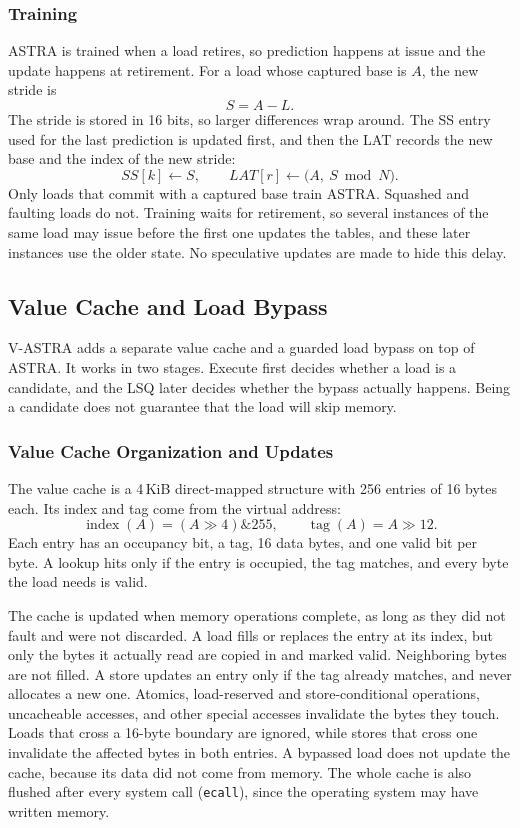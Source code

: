 \subsubsection{Training}

ASTRA is trained when a load retires, so prediction happens at issue
and the update happens at retirement. For a load whose captured base
is \(A\), the new stride is
\[
    S = A - L.
\]
The stride is stored in 16 bits, so larger differences wrap around.
The SS entry used for the last prediction is updated first, and then
the LAT records the new base and the index of the new stride:
\[
    SS[k] \leftarrow S, \qquad
    LAT[r] \leftarrow \bigl(A,\ S \bmod N\bigr).
\]
Only loads that commit with a captured base train ASTRA. Squashed and
faulting loads do not. Training waits for retirement, so several
instances of the same load may issue before the first one updates the
tables, and these later instances use the older state. No speculative
updates are made to hide this delay.

\subsection{Value Cache and Load Bypass}
\label{sec:impl-vcache}

V-ASTRA adds a separate value cache and a guarded load bypass on top
of ASTRA. It works in two stages. Execute first decides whether a load
is a candidate, and the LSQ later decides whether the bypass actually
happens. Being a candidate does not guarantee that the load will skip
memory.

\subsubsection{Value Cache Organization and Updates}

The value cache is a 4\,KiB direct-mapped structure with 256 entries
of 16 bytes each. Its index and tag come from the virtual address:
\[
    \operatorname{index}(A) = (A \gg 4) \mathbin{\&} 255,
    \qquad
    \operatorname{tag}(A) = A \gg 12.
\]
Each entry has an occupancy bit, a tag, 16 data bytes, and one valid
bit per byte. A lookup hits only if the entry is occupied, the tag
matches, and every byte the load needs is valid.

The cache is updated when memory operations complete, as long as they
did not fault and were not discarded. A load fills or replaces the
entry at its index, but only the bytes it actually read are copied in
and marked valid. Neighboring bytes are not filled. A store updates an
entry only if the tag already matches, and never allocates a new one.
Atomics, load-reserved and store-conditional operations, uncacheable
accesses, and other special accesses invalidate the bytes they touch.
Loads that cross a 16-byte boundary are ignored, while stores that
cross one invalidate the affected bytes in both entries. A bypassed
load does not update the cache, because its data did not come from
memory. The whole cache is also flushed after every system call
(\texttt{ecall}), since the operating system may have written memory.


